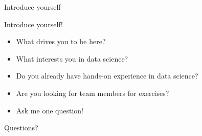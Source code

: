\documentclass[aspectratio=169,handout]{../latex_main/tntbeamer}  %
\begin{document}
\begin{frame}[c]{Introduce yourself}


\begin{center}
\huge
    Introduce yourself!
\end{center}

\begin{itemize}
    \item What drives you to be here?
    \item What interests you in data science?
    \item Do you already have hands-on experience in data science?
    \item Are you looking for team members for exercises?
    \item Ask me one question!
\end{itemize}

\end{frame}


\begin{frame}[c]{}

\centering
\huge
Questions?

\end{frame}

	
\end{document}
